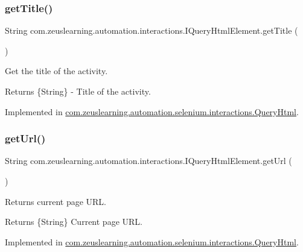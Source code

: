 \subsubsection{\texorpdfstring{get\+Title()}{getTitle()}}
{\footnotesize\ttfamily String com.\+zeuslearning.\+automation.\+interactions.\+I\+Query\+Html\+Element.\+get\+Title (\begin{DoxyParamCaption}{ }\end{DoxyParamCaption})}

Get the title of the activity.

\begin{DoxyReturn}{Returns}
\{String\} -\/ Title of the activity. 
\end{DoxyReturn}


Implemented in \hyperlink{classcom_1_1zeuslearning_1_1automation_1_1selenium_1_1interactions_1_1QueryHtml_ad0bcb480f1543a6d81c3c83bd0a15773}{com.\+zeuslearning.\+automation.\+selenium.\+interactions.\+Query\+Html}.

\hypertarget{interfacecom_1_1zeuslearning_1_1automation_1_1interactions_1_1IQueryHtmlElement_a78298d723dbd0b7bef6098971596b78f}{}\label{interfacecom_1_1zeuslearning_1_1automation_1_1interactions_1_1IQueryHtmlElement_a78298d723dbd0b7bef6098971596b78f} 
\subsubsection{\texorpdfstring{get\+Url()}{getUrl()}}
{\footnotesize\ttfamily String com.\+zeuslearning.\+automation.\+interactions.\+I\+Query\+Html\+Element.\+get\+Url (\begin{DoxyParamCaption}{ }\end{DoxyParamCaption})}

Returns current page U\+RL.

\begin{DoxyReturn}{Returns}
\{String\} Current page U\+RL. 
\end{DoxyReturn}


Implemented in \hyperlink{classcom_1_1zeuslearning_1_1automation_1_1selenium_1_1interactions_1_1QueryHtml_ad06d213ffd977196fb656e8e8bac6808}{com.\+zeuslearning.\+automation.\+selenium.\+interactions.\+Query\+Html}.


